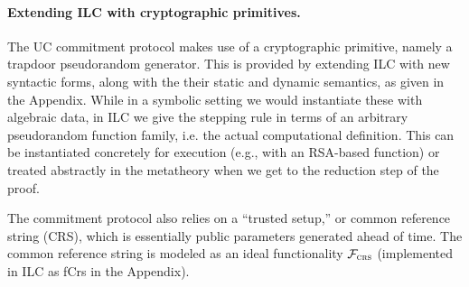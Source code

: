 
\paragraph{Extending ILC with cryptographic primitives.}
The UC commitment protocol makes use of a cryptographic primitive, namely a trapdoor pseudorandom generator. This is provided by extending ILC with new syntactic forms, along with the their static and dynamic semantics, as given in the Appendix.
While in a symbolic setting we would instantiate these with algebraic data, in ILC we give the stepping rule in terms of an arbitrary pseudorandom function family, i.e. the actual computational definition.
This can be instantiated concretely for execution (e.g., with an RSA-based function) or treated abstractly in the metatheory when we get to the reduction step of the proof.

The commitment protocol also relies on a
``trusted setup,'' or common reference string (CRS), which is essentially
public parameters generated ahead of time. The common reference string is
modeled as an ideal functionality $\mathcal{{F}}_{\textsc{crs}}$ (implemented
in ILC as \textsf{fCrs} in the Appendix).





